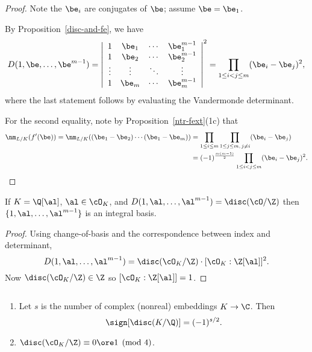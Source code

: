 \begin{proof}
Note the $\be_i$ are conjugates of $\be$; assume $\be=\be_1$.

By Proposition~\ref{disc-and-fe}, we have
\[
D(1,\be,\ldots, \be^{m-1})=
\left|\begin{array}{cccc}
1 & \be_{1} & \cdots & \be_1^{m-1}\\
1 & \be_{2} & \cdots & \be_{2}^{m-1}\\
\vdots & \vdots & \ddots & \vdots\\
1 & \be_{m} & \cdots & \be_{m}^{m-1}\end{array}\right|^{2}
=
\prod_{1\leq i<j\leq m}(\be_i-\be_j)^2,
\]
where the last statement follows by evaluating the Vandermonde determinant.

For the second equality, note by Proposition~\ref{ntr-fext}(1c) that
\begin{align*}
\nm_{L/K}(f'(\be))=\nm_{L/K}((\be_1-\be_2)\cdots (\be_1-\be_m))&=\prod_{1\le i\le m}\prod_{1\le j\le m,\,j\ne i}
(\be_i-\be_j)\\
&=(-1)^{\frac{m(m-1)}2}
\prod_{1\leq i<j\leq m}(\be_i-\be_j)^2.
\end{align*}
\end{proof}
\begin{pr}%
If $K=\Q[\al]$, $\al\in \cO_K$, and $D(1,\al,\ldots, \al^{m-1})=\disc(\cO/\Z)$ then $\{1,\al,\ldots, \al^{m-1}\}$ is an integral basis.
\end{pr}
\begin{proof}
Using change-of-basis and the correspondence between index and determinant,
\[
D(1,\al,\ldots, \al^{m-1})=\disc(\cO_K/\Z)\cdot [\cO_K:\Z[\al]]^2.
\]
Now $\disc(\cO_K/\Z)\in \Z$ so $[\cO_K:\Z[\al]]=1$.
\end{proof}
\begin{thm}$\,$
\begin{enumerate}
\item Let $s$ is the number of %
complex (nonreal) embeddings $K\to \C$. 
Then
\[\sign[\disc(K/\Q)]=(-1)^{s/2}.\] 
\item $\disc(\cO_K/\Z)\equiv 0\ore 1\pmod 4$.
\end{enumerate}
\end{thm}
